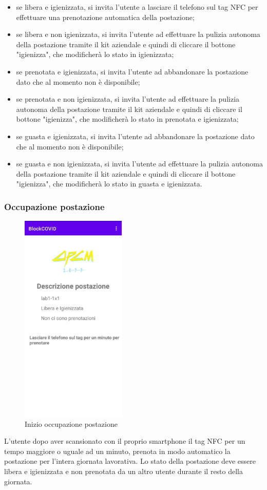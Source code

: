 	\begin{itemize}
		\item se libera e igienizzata, si invita l'utente a lasciare il telefono sul tag NFC per effettuare una prenotazione automatica della postazione;
		\item se libera e non igienizzata, si invita l'utente ad effettuare la pulizia autonoma della postazione tramite il kit aziendale e quindi di cliccare il bottone "igienizza", che modificherà lo stato in igienizzata;
		\item se prenotata e igienizzata, si invita l'utente ad abbandonare la postazione dato che al momento non è disponibile;
		\item se prenotata e non igienizzata, si invita l'utente ad effettuare la pulizia autonoma della postazione tramite il kit aziendale e quindi di cliccare il bottone "igienizza", che modificherà lo stato in prenotata e igienizzata;
		\item se guasta e igienizzata, si invita l'utente ad abbandonare la postazione dato che al momento non è disponibile;
		\item se guasta e non igienizzata, si invita l'utente ad effettuare la pulizia autonoma della postazione tramite il kit aziendale e quindi di cliccare il bottone "igienizza", che modificherà lo stato in guasta e igienizzata.
	\end{itemize}
	
	\subsubsection{Occupazione postazione}
	\begin{figure}[H]
		\centering
		\includegraphics[width=5cm]{res/images/DescrizionePostazione1.png}
		\caption{Inizio occupazione postazione}
	\end{figure}
	L'utente dopo aver scansionato con il proprio smartphone il tag NFC per un tempo maggiore o uguale ad un minuto, prenota in modo automatico la postazione per
	l’intera giornata lavorativa. Lo stato della postazione deve essere libera e igienizzata e non prenotata da un altro utente durante il resto della giornata.
